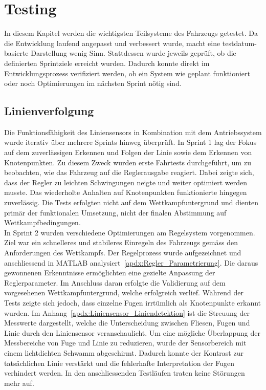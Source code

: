 \documentclass[main.tex]{subfiles} %
\begin{document}

\section{Testing}
In diesem Kapitel werden die wichtigsten Teilsysteme des Fahrzeugs
getestet. Da die Entwicklung laufend angepasst und verbessert wurde,
macht eine testdatum-basierte Darstellung wenig Sinn. Stattdessen
wurde jeweils geprüft, ob die definierten Sprintziele erreicht wurden.
Dadurch konnte direkt im Entwicklungsprozess verifiziert werden, ob
ein System wie geplant funktioniert oder noch Optimierungen im nächsten
Sprint nötig sind.

\subsection*{Linienverfolgung}
Die Funktionsfähigkeit des Liniensensors in Kombination mit dem
Antriebssystem wurde iterativ über mehrere Sprints hinweg überprüft.
In Sprint 1 lag der Fokus auf dem zuverlässigen Erkennen und Folgen
der Linie sowie dem Erkennen von Knotenpunkten. Zu diesem Zweck
wurden erste Fahrtests durchgeführt, um zu beobachten, wie das
Fahrzeug auf die Reglerausgabe reagiert. Dabei zeigte sich, dass der
Regler zu leichten Schwingungen neigte und weiter optimiert werden
musste. Das wiederholte Anhalten auf Knotenpunkten funktionierte
hingegen zuverlässig. Die Tests erfolgten nicht auf dem
Wettkampfuntergrund und dienten primär der funktionalen Umsetzung, nicht
der finalen Abstimmung auf Wettkampfbedingungen.\\
In Sprint 2 wurden verschiedene Optimierungen am Regelsystem
vorgenommen. Ziel war ein schnelleres und stabileres Einregeln des Fahrzeugs
gemäss den Anforderungen des Wettkampfs. Der Regelprozess wurde
aufgezeichnet und anschliessend in MATLAB
analysiert~\ref{apdx:Regler_Parametrierung}.
Die daraus gewonnenen Erkenntnisse ermöglichten eine gezielte
Anpassung der Reglerparameter. Im Anschluss daran erfolgte die Validierung auf
dem vorgesehenen Wettkampfuntergrund, welche erfolgreich verlief.
Während der Tests zeigte sich jedoch, dass einzelne Fugen irrtümlich
als Knotenpunkte erkannt wurden. Im
Anhang~\ref{apdx:Liniensensor_Liniendetektion}
ist die Streuung der Messwerte dargestellt, welche die Unterscheidung
zwischen Fliesen, Fugen und Linie durch den Liniensensor veranschaulicht.
Um eine mögliche Überlappung der Messbereiche von Fuge und Linie zu
reduzieren, wurde der Sensorbereich mit einem lichtdichten Schwamm abgeschirmt.
Dadurch konnte der Kontrast zur tatsächlichen Linie verstärkt und die
fehlerhafte Interpretation der Fugen verhindert werden. In den anschliessenden
Testläufen traten keine Störungen mehr auf.
\end{document}

